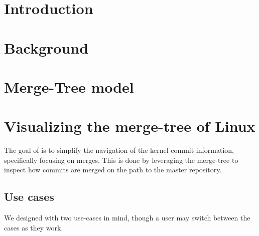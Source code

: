 \documentclass[draft]{IEEEtran}
\begin{document}
\title{\TheTitle}

\author{
        \IEEEauthorblockA{\TheAuthors}
}
\maketitle

\begin{abstract}

  

\end{abstract}


\begin{IEEEkeywords}
  \TheKeywords
\end{IEEEkeywords}

\section{Introduction}



\section{Background}
\label{sec:background}



\section{Merge-Tree model}
\label{sec:mergetree}



\section{Visualizing the merge-tree of Linux}

The goal of \tool is to simplify the navigation of the kernel commit
information, specifically focusing on merges. This is done by leveraging
the merge-tree to inspect how commits are merged on the path to the
master repository.

\subsection{Use cases}

We designed \tool with two use-cases in mind, though a user may switch
between the cases as they work.
\end{document}
